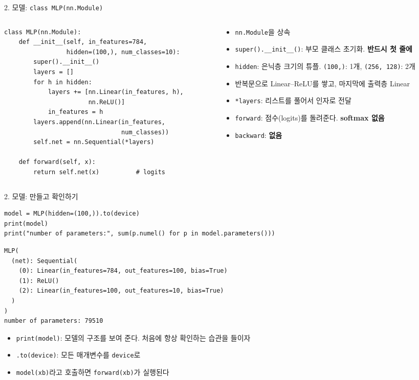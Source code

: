 \documentclass[aspectratio=169,11pt]{beamer}
\newcommand{\code}[1]{\texttt{#1}}
\begin{document}
\begin{frame}[fragile]{2. 모델: \code{class MLP(nn.Module)}}
\begin{columns}[T,onlytextwidth]
\begin{column}{0.55\textwidth}
\begin{lstlisting}
class MLP(nn.Module):
    def __init__(self, in_features=784,
                 hidden=(100,), num_classes=10):
        super().__init__()
        layers = []
        for h in hidden:
            layers += [nn.Linear(in_features, h),
                       nn.ReLU()]
            in_features = h
        layers.append(nn.Linear(in_features,
                                num_classes))
        self.net = nn.Sequential(*layers)

    def forward(self, x):
        return self.net(x)          # logits
\end{lstlisting}
\end{column}
\begin{column}{0.42\textwidth}
\small
\begin{itemize}
\item \code{nn.Module}을 상속
\item \code{super().\_\_init\_\_()}: 부모 클래스 초기화. \textbf{반드시 첫 줄에}
\item \code{hidden}: 은닉층 크기의 튜플. \code{(100,)}: 1개, \code{(256, 128)}: 2개
\item 반복문으로 Linear--ReLU를 쌓고, 마지막에 출력층 Linear
\item \code{*layers}: 리스트를 풀어서 인자로 전달
\item \code{forward}: 점수(logits)를 돌려준다. \textbf{softmax 없음}
\item \code{backward}: \textbf{없음}
\end{itemize}
\end{column}
\end{columns}
\end{frame}

\begin{frame}[fragile]{2. 모델: 만들고 확인하기}
\begin{lstlisting}
model = MLP(hidden=(100,)).to(device)
print(model)
print("number of parameters:", sum(p.numel() for p in model.parameters()))
\end{lstlisting}
\begin{lstlisting}[style=outstyle]
MLP(
  (net): Sequential(
    (0): Linear(in_features=784, out_features=100, bias=True)
    (1): ReLU()
    (2): Linear(in_features=100, out_features=10, bias=True)
  )
)
number of parameters: 79510
\end{lstlisting}
\begin{itemize}
\item \code{print(model)}: 모델의 구조를 보여 준다. 처음에 항상 확인하는 습관을 들이자
\item \code{.to(device)}: 모든 매개변수를 \code{device}로
\item \code{model(xb)}라고 호출하면 \code{forward(xb)}가 실행된다
\end{itemize}
\end{frame}
\end{document}
